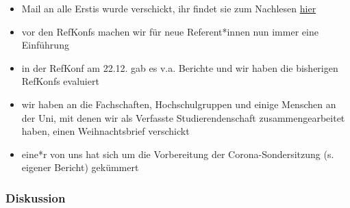 \begin{itemize}
    \item Mail an alle Erstis wurde verschickt, ihr findet sie zum Nachlesen \href{https://www.stura.uni-heidelberg.de/2020/12/17/rundmail-drei-ratschlaege-fuer-alle-erstis/}{hier}
    \item vor den RefKonfs machen wir für neue Referent*innen nun immer eine Einführung
    \item in der RefKonf am 22.12. gab es v.a. Berichte und wir haben die bisherigen RefKonfs evaluiert
    \item wir haben an die Fachschaften, Hochschulgruppen und einige Menschen an der Uni, mit denen wir als Verfasste Studierendenschaft zusammengearbeitet haben, einen Weihnachtsbrief verschickt
    \item eine*r von uns hat sich um die Vorbereitung der Corona-Sondersitzung (s. eigener Bericht) gekümmert
\end{itemize}
\subsubsection{Diskussion}
\ul{
}

